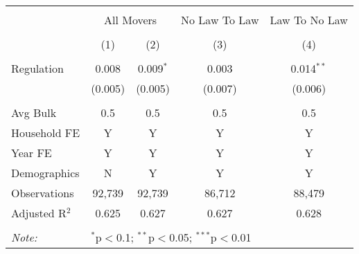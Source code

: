 
\begin{table}[!htbp] \centering 
  \caption{} 
  \label{} 
\begin{tabular}{@{\extracolsep{5pt}}lcccc} 
\\[-1.8ex]\hline 
\hline \\[-1.8ex] 
 & \multicolumn{2}{c}{All Movers} & No Law To Law & Law To No Law \\ 
\\[-1.8ex] & (1) & (2) & (3) & (4)\\ 
\hline \\[-1.8ex] 
 Regulation & 0.008 & 0.009$^{*}$ & 0.003 & 0.014$^{**}$ \\ 
  & (0.005) & (0.005) & (0.007) & (0.006) \\ 
 \hline \\[-1.8ex] 
Avg Bulk & 0.5 & 0.5 & 0.5 & 0.5 \\ 
Household FE & Y & Y & Y & Y \\ 
Year FE & Y & Y & Y & Y \\ 
Demographics & N & Y & Y & Y \\ 
Observations & 92,739 & 92,739 & 86,712 & 88,479 \\ 
Adjusted R$^{2}$ & 0.625 & 0.627 & 0.627 & 0.628 \\ 
\hline 
\hline \\[-1.8ex] 
\textit{Note:}  & \multicolumn{4}{l}{$^{*}$p$<$0.1; $^{**}$p$<$0.05; $^{***}$p$<$0.01} \\ 
\end{tabular} 
\end{table} 
